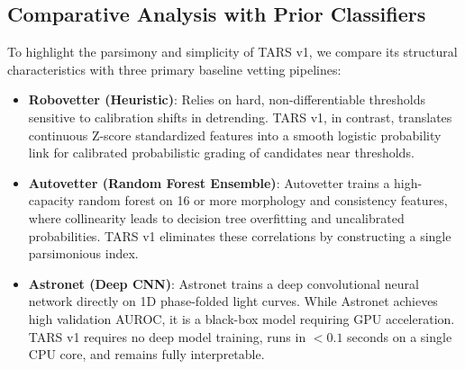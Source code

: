\subsection{Comparative Analysis with Prior Classifiers} \label{sec:disc_comparison}
To highlight the parsimony and simplicity of TARS v1, we compare its structural characteristics with three primary baseline vetting pipelines:
\begin{itemize}
\item \textbf{Robovetter (Heuristic)}: Relies on hard, non-differentiable thresholds sensitive to calibration shifts in detrending. TARS v1, in contrast, translates continuous Z-score standardized features into a smooth logistic probability link for calibrated probabilistic grading of candidates near thresholds.
\item \textbf{Autovetter (Random Forest Ensemble)}: Autovetter trains a high-capacity random forest on 16 or more morphology and consistency features, where collinearity leads to decision tree overfitting and uncalibrated probabilities. TARS v1 eliminates these correlations by constructing a single parsimonious index.
\item \textbf{Astronet (Deep CNN)}: Astronet trains a deep convolutional neural network directly on 1D phase-folded light curves. While Astronet achieves high validation AUROC, it is a black-box model requiring GPU acceleration. TARS v1 requires no deep model training, runs in $< 0.1$ seconds on a single CPU core, and remains fully interpretable.
\end{itemize}

